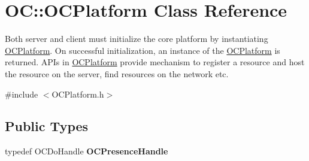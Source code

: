 \hypertarget{classOC_1_1OCPlatform}{}\section{O\+C\+:\+:O\+C\+Platform Class Reference}
\label{classOC_1_1OCPlatform}


Both server and client must initialize the core platform by instantiating \hyperlink{classOC_1_1OCPlatform}{O\+C\+Platform}. On successful initialization, an instance of the \hyperlink{classOC_1_1OCPlatform}{O\+C\+Platform} is returned. A\+P\+Is in \hyperlink{classOC_1_1OCPlatform}{O\+C\+Platform} provide mechanism to register a resource and host the resource on the server, find resources on the network etc.  




{\ttfamily \#include $<$O\+C\+Platform.\+h$>$}

\subsection*{Public Types}
\begin{DoxyCompactItemize}
\item 
\hypertarget{classOC_1_1OCPlatform_a61eeef7ea8333dd6a6656871748aa6e5}{}typedef O\+C\+Do\+Handle {\bfseries O\+C\+Presence\+Handle}\label{classOC_1_1OCPlatform_a61eeef7ea8333dd6a6656871748aa6e5}

\end{DoxyCompactItemize}
